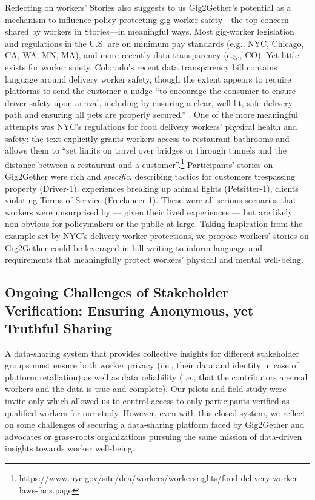 {Reflecting on workers' Stories also suggests to us Gig2Gether's potential as a mechanism to influence policy protecting gig worker safety---the top concern shared by workers in Stories---in meaningful ways. Most gig-worker legislation and regulations in the U.S. are on minimum pay standards (e.g., NYC, Chicago, CA, WA, MN, MA), and more recently data transparency (e.g., CO). Yet little exists for worker safety. Colorado's recent data transparency bill contains language around delivery worker safety, though the extent appears to require platforms to send the customer a nudge ``to encourage the consumer to ensure driver safety upon arrival, including by ensuring a clear, well-lit, safe delivery path and ensuring all pets are properly secured.'' \cite{Colorado_General_Assembly_dnc_2024}. %
One of the more meaningful attempts was NYC's regulations for food delivery workers' physical health and safety: the text explicitly grants workers access to restaurant bathrooms and allows them to ``set limits on travel over bridges or through tunnels and the distance between a restaurant and a customer''.\footnote{https://www.nyc.gov/site/dca/workers/workersrights/food-delivery-worker-laws-faqs.page} 
Participants' stories on Gig2Gether were rich and \textit{specific}, describing tactics for customers trespassing property (Driver-1), experiences breaking up animal fights (Petsitter-1), clients violating Terms of Service (Freelancer-1). These were all serious scenarios that workers were unsurprised by --- given their lived experiences --- but are likely non-obvious for policymakers or the public at large. Taking inspiration from the example set by NYC's delivery worker protections, we propose workers' stories on Gig2Gether could be leveraged in bill writing to inform language and requirements that meaningfully protect workers' physical and mental well-being.}

\subsection{Ongoing Challenges of Stakeholder Verification: Ensuring Anonymous, yet Truthful Sharing} \label{ongoing}

A data-sharing system that provides collective insights for different stakeholder groups must ensure both worker privacy (i.e., their data and identity in case of platform retaliation) as well as data reliability (i.e., that the contributors are real workers and the data is true and complete). Our pilots and field study were invite-only which allowed us to control access to only participants verified as qualified workers for our study. However, even with this closed system, we reflect on some challenges of securing a data-sharing platform faced by Gig2Gether and advocates or grass-roots organizations pursuing the same mission of data-driven insights towards worker well-being. 

